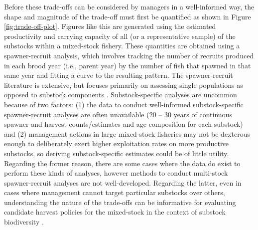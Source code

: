 \documentclass[12pt,]{book}
\theoremstyle{definition}
\theoremstyle{definition}
\theoremstyle{definition}
\theoremstyle{remark}
\begin{document}
Before these trade-offs can be considered by managers in a well-informed
way, the shape and magnitude of the trade-off must first be quantified
as shown in Figure \ref{fig:trade-off-plot}. Figures like this are
generated using the estimated productivity and carrying capacity of all
(or a representative sample) of the substocks within a mixed-stock
fishery. These quantities are obtained using a spawner-recruit analysis,
which involves tracking the number of recruits produced in each brood
year (i.e., parent year) by the number of fish that spawned in that same
year and fitting a curve to the resulting pattern. The spawner-recruit
literature is extensive, but focuses primarily on assessing single
populations as opposed to substock components \citep[but see the work on
Skeena River, British Columbia sockeye salmon \emph{O. nerka}
substocks;][]{walters-etal-2008, korman-english-2013}. Substock-specific
analyses are uncommon because of two factors: (1) the data to conduct
well-informed substock-specific spawner-recruit analyses are often
unavailable (20 -- 30 years of continuous spawner and harvest
counts/estimates and age composition for each substock) and (2)
management actions in large mixed-stock fisheries may not be dexterous
enough to deliberately exert higher exploitation rates on more
productive substocks, so deriving substock-specific estimates could be
of little utility. Regarding the former reason, there are some cases
where the data do exist to perform these kinds of analyses, however
methods to conduct multi-stock spawner-recruit analyses are not
well-developed. Regarding the latter, even in cases where management
cannot target particular substocks over others, understanding the nature
of the trade-offs can be informative for evaluating candidate harvest
policies for the mixed-stock in the context of substock biodiversity
\citep{walters-etal-2018}.
\end{document}
